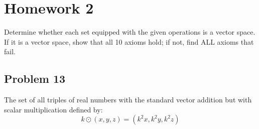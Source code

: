 





\section*{Homework 2}

Determine whether each set equipped with the given operations is a vector space.
If it is a vector space, show that all 10 axioms hold; if not, find ALL axioms that fail.

\subsection*{Problem 13}
The set of all triples of real numbers with the standard vector addition but with scalar multiplication defined by:
\[
  k \odot (x,y,z) = (k^2x,k^2y,k^2z)
\]
